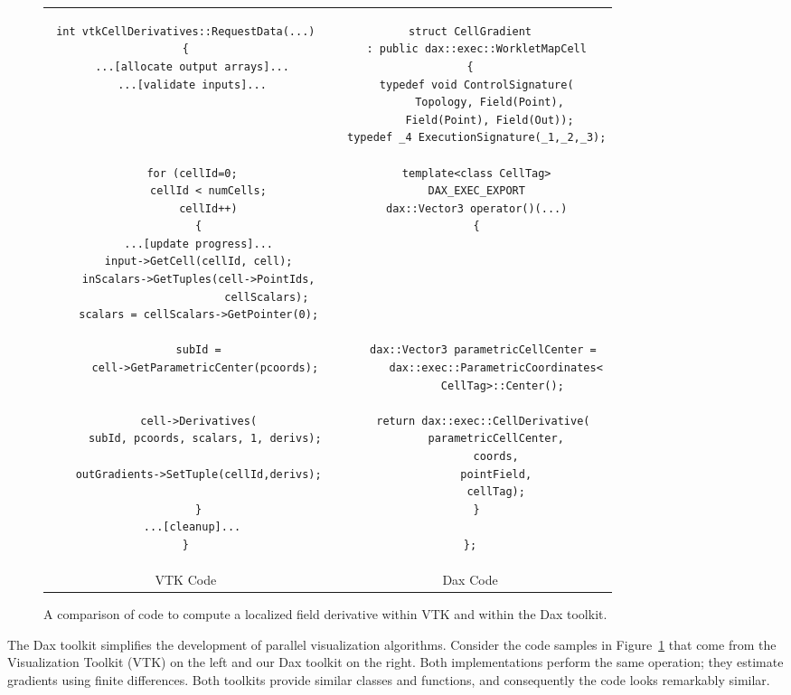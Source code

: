\begin{figure}
\centering
\begin{tabular}{cc}
\begin{lstlisting}
int vtkCellDerivatives::RequestData(...)
{
  ...[allocate output arrays]...
  ...[validate inputs]...




  for (cellId=0;
       cellId < numCells;
       cellId++)
    {
    ...[update progress]...
    input->GetCell(cellId, cell);
    inScalars->GetTuples(cell->PointIds,
                         cellScalars);
    scalars = cellScalars->GetPointer(0);

    subId =
      cell->GetParametricCenter(pcoords);


    cell->Derivatives(
      subId, pcoords, scalars, 1, derivs);
 
    outGradients->SetTuple(cellId,derivs);

    }
  ...[cleanup]...
}
\end{lstlisting}
&
\begin{lstlisting}
struct CellGradient
  : public dax::exec::WorkletMapCell
{
  typedef void ControlSignature(
      Topology, Field(Point),
      Field(Point), Field(Out));
  typedef _4 ExecutionSignature(_1,_2,_3);
 
  template<class CellTag>
  DAX_EXEC_EXPORT
  dax::Vector3 operator()(...)
  {






    dax::Vector3 parametricCellCenter =
        dax::exec::ParametricCoordinates<
          CellTag>::Center();
 
    return dax::exec::CellDerivative(
        parametricCellCenter,
        coords,
        pointField,
        cellTag);
  }
 
};
\end{lstlisting}
\\
VTK Code & Dax Code
\end{tabular}
\caption[Comparison of VTK code and Dax code.]{A comparison of code to
  compute a localized field derivative within VTK and within the Dax
  toolkit.}
\label{fig:CompareVTKDax}
\end{figure}

The Dax toolkit simplifies the development of parallel visualization
algorithms. Consider the code samples in Figure~\ref{fig:CompareVTKDax}
that come from the Visualization Toolkit (VTK) on the left and our Dax
toolkit on the right. Both implementations perform the same operation; they
estimate gradients using finite differences. Both toolkits provide similar
classes and functions, and consequently the code looks remarkably similar.

